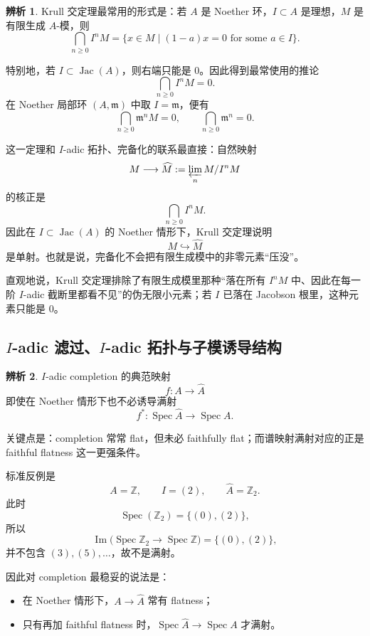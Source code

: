 \documentclass[a4paper]{ctexart}
\theoremstyle{definition}
\theoremstyle{analysis}
\newtheorem{remark}{辨析}[section]
\theoremstyle{plain}
\begin{document}
\begin{remark}
\label{rem:krull-intersection}
Krull 交定理最常用的形式是：若 \(A\) 是 Noether 环，\(I\subset A\) 是理想，\(M\) 是有限生成 \(A\)-模，则
\[
  \bigcap_{n\ge 0} I^nM
  =
  \{x\in M\mid (1-a)x=0 \text{ for some } a\in I\}.
\]

特别地，若 \(I\subset \operatorname{Jac}(A)\)，则右端只能是 \(0\)。因此得到最常使用的推论
\[
  \bigcap_{n\ge 0} I^nM=0.
\]
在 Noether 局部环 \((A,\mathfrak m)\) 中取 \(I=\mathfrak m\)，便有
\[
  \bigcap_{n\ge 0}\mathfrak m^nM=0,
  \qquad
  \bigcap_{n\ge 0}\mathfrak m^n=0.
\]

这一定理和 \(I\)-adic 拓扑、完备化的联系最直接：自然映射
\[
  M\longrightarrow \widehat M:=\varprojlim_n M/I^nM
\]
的核正是
\[
  \bigcap_{n\ge 0} I^nM.
\]
因此在 \(I\subset \operatorname{Jac}(A)\) 的 Noether 情形下，Krull 交定理说明
\[
  M\hookrightarrow \widehat M
\]
是单射。也就是说，完备化不会把有限生成模中的非零元素“压没”。

直观地说，Krull 交定理排除了有限生成模里那种“落在所有 \(I^nM\) 中、因此在每一阶 \(I\)-adic 截断里都看不见”的伪无限小元素；若 \(I\) 已落在 Jacobson 根里，这种元素只能是 \(0\)。
\end{remark}

\subsection{\texorpdfstring{\(I\)-adic 滤过、\(I\)-adic 拓扑与子模诱导结构}{I-adic 滤过、I-adic 拓扑与子模诱导结构}}\label{subsec:iadic-subspace-topology}

\begin{remark}
\label{rem:completion-spec-not-surjective}
\(I\)-adic completion 的典范映射
\[
  f:A\longrightarrow \widehat A
\]
即使在 Noether 情形下也不必诱导满射
\[
  f^*:\operatorname{Spec}\widehat A\to \operatorname{Spec}A.
\]

关键点是：completion 常常 flat，但未必 faithfully flat；而谱映射满射对应的正是 faithful flatness 这一更强条件。

标准反例是
\[
  A=\mathbb Z,\qquad I=(2),\qquad \widehat A=\mathbb Z_2.
\]
此时
\[
  \operatorname{Spec}(\mathbb Z_2)=\{(0),(2)\},
\]
所以
\[
  \operatorname{Im}\bigl(\operatorname{Spec}\mathbb Z_2\to \operatorname{Spec}\mathbb Z\bigr)
  =
  \{(0),(2)\},
\]
并不包含 \((3),(5),\dots\)，故不是满射。

因此对 completion 最稳妥的说法是：
\begin{itemize}
  \item 在 Noether 情形下，\(A\to \widehat A\) 常有 flatness；
  \item 只有再加 faithful flatness 时，\(\operatorname{Spec}\widehat A\to \operatorname{Spec}A\) 才满射。
\end{itemize}
\end{remark}
\end{document}
